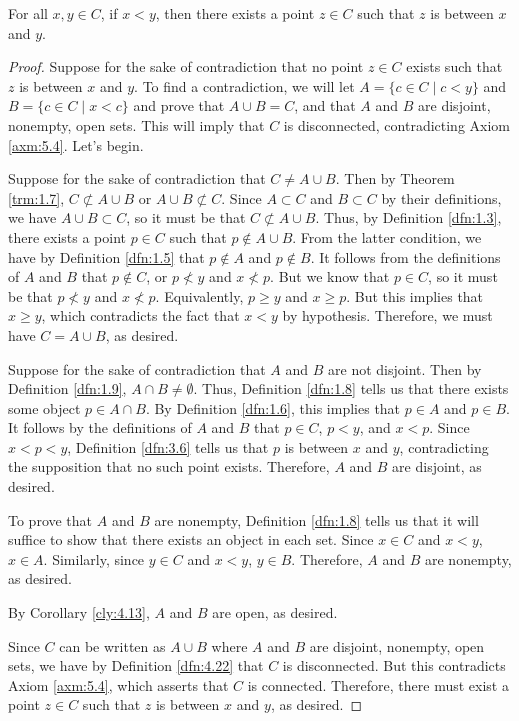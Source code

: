 \documentclass[../main.tex]{subfiles}
\begin{document}
\begin{theorem}\label{trm:5.2}
    For all $x,y\in C$, if $x<y$, then there exists a point $z\in C$ such that $z$ is between $x$ and $y$.
    \begin{proof}
        Suppose for the sake of contradiction that no point $z\in C$ exists such that $z$ is between $x$ and $y$. To find a contradiction, we will let $A=\{c\in C\mid c<y\}$ and $B=\{c\in C\mid x<c\}$ and prove that $A\cup B=C$, and that $A$ and $B$ are disjoint, nonempty, open sets. This will imply that $C$ is disconnected, contradicting Axiom \ref{axm:5.4}. Let's begin.\par
        Suppose for the sake of contradiction that $C\neq A\cup B$. Then by Theorem \ref{trm:1.7}, $C\not\subset A\cup B$ or $A\cup B\not\subset C$. Since $A\subset C$ and $B\subset C$ by their definitions, we have $A\cup B\subset C$, so it must be that $C\not\subset A\cup B$. Thus, by Definition \ref{dfn:1.3}, there exists a point $p\in C$ such that $p\notin A\cup B$. From the latter condition, we have by Definition \ref{dfn:1.5} that $p\notin A$ and $p\notin B$. It follows from the definitions of $A$ and $B$ that $p\notin C$, or $p\not<y$ and $x\not<p$. But we know that $p\in C$, so it must be that $p\not<y$ and $x\not<p$. Equivalently, $p\geq y$ and $x\geq p$. But this implies that $x\geq y$, which contradicts the fact that $x<y$ by hypothesis. Therefore, we must have $C=A\cup B$, as desired.\par
        Suppose for the sake of contradiction that $A$ and $B$ are not disjoint. Then by Definition \ref{dfn:1.9}, $A\cap B\neq\emptyset$. Thus, Definition \ref{dfn:1.8} tells us that there exists some object $p\in A\cap B$. By Definition \ref{dfn:1.6}, this implies that $p\in A$ and $p\in B$. It follows by the definitions of $A$ and $B$ that $p\in C$, $p<y$, and $x<p$. Since $x<p<y$, Definition \ref{dfn:3.6} tells us that $p$ is between $x$ and $y$, contradicting the supposition that no such point exists. Therefore, $A$ and $B$ are disjoint, as desired.\par
        To prove that $A$ and $B$ are nonempty, Definition \ref{dfn:1.8} tells us that it will suffice to show that there exists an object in each set. Since $x\in C$ and $x<y$, $x\in A$. Similarly, since $y\in C$ and $x<y$, $y\in B$. Therefore, $A$ and $B$ are nonempty, as desired.\par
        By Corollary \ref{cly:4.13}, $A$ and $B$ are open, as desired.\par
        Since $C$ can be written as $A\cup B$ where $A$ and $B$ are disjoint, nonempty, open sets, we have by Definition \ref{dfn:4.22} that $C$ is disconnected. But this contradicts Axiom \ref{axm:5.4}, which asserts that $C$ is connected. Therefore, there must exist a point $z\in C$ such that $z$ is between $x$ and $y$, as desired.
    \end{proof}
\end{theorem}
\end{document}
